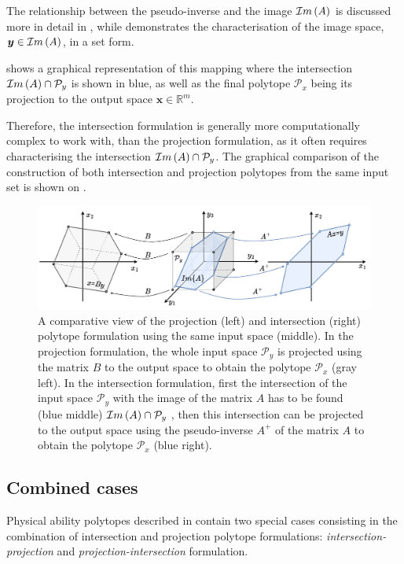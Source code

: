 The relationship between the pseudo-inverse and the image $\mathcal{I}m\left(A\right)$ is discussed more in detail in , while   demonstrates the characterisation of the image space, $\bm{y}\in\mathcal{I}m\left(A\right)$, in a set form. 


 shows a graphical representation of this mapping where the intersection $ \mathcal{I}m\left(A\right)\cap\mathcal{P}_y$ is shown in blue, as well as the final polytope $\mathcal{P}_x$ being its projection to the output space $\bm{x}\in \mathbb{R}^m$. 

Therefore, the intersection formulation is generally more computationally complex to work with, than the projection formulation, as it often requires characterising the intersection $\mathcal{I}m\left(A\right)\cap\mathcal{P}_y$. The graphical comparison of the construction of both intersection and projection polytopes from the same input set is shown on .


\begin{figure}
    \centering
    \includegraphics[width=\linewidth]{Chapters/imgs/intersection_projection.pdf}
    \caption{A comparative view of the projection (left) and intersection (right) polytope formulation using the same input space (middle). In the projection formulation, the whole input space $\mathcal{P}_y$ is projected using the matrix $B$ to the output space to obtain the polytope $\mathcal{P}_x$ (gray left). In the intersection formulation, first the intersection of the input space $\mathcal{P}_y$ with the image of the matrix $A$ has to be found (blue middle) $\mathcal{I}m\left(A\right) \cap \mathcal{P}_y$ , then this intersection can be projected to the output space using the pseudo-inverse $A^+$ of the matrix $A$ to obtain the polytope $\mathcal{P}_x$ (blue right).}
    \label{fig:inter_proj}
\end{figure}

\subsection{Combined cases}
\label{ch:combined_forms}
Physical ability polytopes described in  contain two special cases consisting in the combination of intersection and projection polytope formulations: \textit{intersection-projection} and \textit{projection-intersection} formulation.

